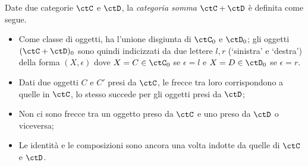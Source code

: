 \begin{definition}\label{def_cat_somma}
 Date due categorie \(\ctC\) e \(\ctD\), la \emph{categoria somma} \(\ctC+\ctD\) è definita come segue.
 \begin{itemize}
  \item Come classe di oggetti,  ha l'unione disgiunta di \(\ctC_0\) e \(\ctD_0\); gli oggetti \((\ctC+\ctD)_0\) sono quindi indicizzati da due lettere \(l,r\) (`sinistra' e `destra') della forma \((X,\epsilon)\) dove \(X=C\in\ctC_0\) se \(\epsilon = l\) e \(X=D\in\ctD_0\) se \(\epsilon=r\).
  \item Dati due oggetti \(C\) e \(C'\) presi da \(\ctC\), le frecce tra loro corrispondono a quelle in \(\ctC\), lo stesso succede per gli oggetti presi da \(\ctD\);
  \item Non ci sono frecce tra un oggetto preso da \(\ctC\) e uno preso da \(\ctD\) o viceversa;
  \item Le identità e le composizioni sono ancora una volta indotte da quelle di \(\ctC\) e \(\ctD\).
 \end{itemize}
\end{definition}
